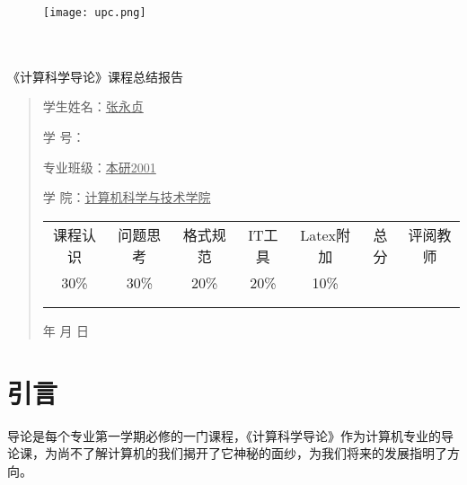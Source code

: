 \documentclass{article}
\renewcommand{\today}{\number\year 年 \number\month 月 \number\day 日}
\begin{document}
\begin{figure}
    \centering
    \texttt{[image: upc.png]}

    \label{figupc}
\end{figure}

	\begin{center}
		\quad \\
		\quad \\
		\heiti \fontsize{45}{17} \quad \quad \quad 
		\vskip 1.5cm
		\heiti {} 《计算科学导论》课程总结报告
	\end{center}
	\vskip 2.0cm
		
	\begin{quotation}
		\doublespacing
		
        \par\setlength\parindent{7em}
		\quad 

		学生姓名：\underline{\qquad  张永贞 \qquad \qquad}

		学\hspace{0.61cm} 号：\underline{\qquad}
		
		专业班级：\underline{\qquad 本研2001 \qquad  }
		
        学\hspace{0.61cm} 院：\underline{计算机科学与技术学院}
		\vskip 2cm
		\centering
		\begin{table}[h]
            \centering 
            \begin{tabular}{|c|c|c|c|c|c|c|}
                \hline
                课程认识 & 问题思 考 & 格式规范  & IT工具  & Latex附加  & 总分 & 评阅教师 \\
                30\% & 30\% & 20\% & 20\% & 10\% &  &  \\
                \hline
                 & & & & & &\\
                & & & & & &\\
                \hline
            \end{tabular}
        \end{table}
		\vskip 2cm
		\today
	\end{quotation}

\thispagestyle{empty}
\newpage
\setcounter{page}{1}
\section{引言}
导论是每个专业第一学期必修的一门课程，《计算科学导论》作为计算机专业的导论课，为尚不了解计算机的我们揭开了它神秘的面纱，为我们将来的发展指明了方向。
\end{document}
